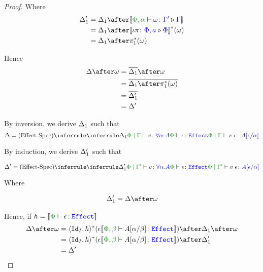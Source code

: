 \documentclass{report}
\begin{document}
\begin{framed}
\begin{proof}
            Where 
            \begin{align*}
                \D_1' & = \D_1\after\deno{\ewrel{\P,\a}{\w}{\G'}{\G}}\\
                & = \D_1\after\deno{\wrel{\i\pi}{\P,a}{\P}}\star(\w)\\
                & = \D_1\after\pstar(\w)
            \end{align*}
            
            Hence \begin{align*}
                \D\after\w & = \bar{\D_1}\after\w\\
                & = \bar{\D_1\after\pstar(\w)}\\
                & = \bar{\D_1'}\\
                & = \D'
            \end{align*}
            
            \case{\vspec}
            By inversion, we derive $\Delta_1$ such that
            \begin{equation}
                \D = \ntreeruleII{\vspec}{\treeruleI{\D_1}{\etyperelation{\P}{\G}{v}{\all{\a}{A}}}}{\wellformede{\P}{\e}}{\etyperelation{\P}{\G}{\eapp{v}{\e}}{A\ssub{\a}{\e}}}
            \end{equation}
            
            By induction, we derive $\Delta_1'$ such that
            
            \begin{equation}
                \D' = \ntreeruleII{\vspec}{\treeruleI{\D_1'}{\etyperelation{\P}{\G'}{v}{\all{\a}{A}}}}{\wellformede{\P}{\e}}{\etyperelation{\P}{\G'}{\eapp{v}{\e}}{A\ssub{\a}{\e}}}
            \end{equation}
            
            Where 
            
            \begin{align*}
                \D_1' = \D\after\w
            \end{align*}
            
            
            
            Hence, if $h = \deno{\typerelation{\P}{\e}{\effect}}$
            \begin{align*}
                \D\after\w &= \pr{\Id{I}}{h}\star(\e{\deno{\typerelation{\P,\b}{A\ssub{\b}{\a}}{\effect}}})\after\D_1\after\w\\
                &= \pr{\Id{I}}{h}\star(\e{\deno{\typerelation{\P,\b}{A\ssub{\b}{\a}}{\effect}}})\after\D_1'\\
                & = \D'
            \end{align*}
    \end{proof} 
\end{framed}   
\end{document}
